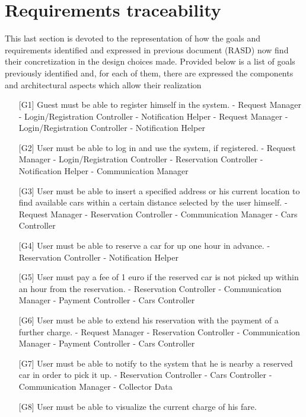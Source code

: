 \documentclass[10pt, a4paper,titlepage]{article}
\begin{document}
\section{Requirements traceability}
This last section is devoted to the representation of how the goals and requirements identified and expressed in previous document (RASD) now find their concretization in the design choices made.
Provided below is a list of goals previously identified and, for each of them, there are expressed the components and architectural aspects which allow their realization
\begin{itemize}
\item[{[G1]}] Guest must be able to register himself in the system.
\subitem - Request Manager 
\subitem - Login/Registration Controller
\subitem - Notification Helper
\subitem - Request Manager 
\subitem - Login/Registration Controller
\subitem - Notification Helper
\item[{[G2]}] User must be able to log in and use the system, if registered.
\subitem - Request Manager
\subitem - Login/Registration Controller
\subitem - Reservation Controller
\subitem - Notification Helper
\subitem - Communication Manager
\item[{[G3]}] User must be able to insert a specified address or his current location to find available cars within a certain distance selected by the user himself.
\subitem - Request Manager
\subitem - Reservation Controller
\subitem - Communication Manager
\subitem - Cars Controller
\item[{[G4]}] User must be able to reserve a car for up one hour in advance.
\subitem - Reservation Controller
\subitem - Notification Helper
\item[{[G5]}] User must pay a fee of 1 euro if the reserved car is not picked up within an hour from the reservation.
\subitem - Reservation Controller
\subitem - Communication Manager
\subitem - Payment Controller
\subitem - Cars Controller
\item[{[G6]}] User must be able to extend his reservation with the payment of a further charge.
\subitem - Request Manager
\subitem - Reservation Controller
\subitem - Communication Manager
\subitem - Payment Controller
\subitem - Cars Controller
\item[{[G7]}] User must be able to notify to the system that he is nearby a reserved car in order to pick it up.
\subitem - Reservation Controller
\subitem - Cars Controller
\subitem - Communication Manager
\subitem - Collector Data
\item[{[G8]}] User must be able to visualize the current charge of his fare.

\end{itemize}
\end{document}
